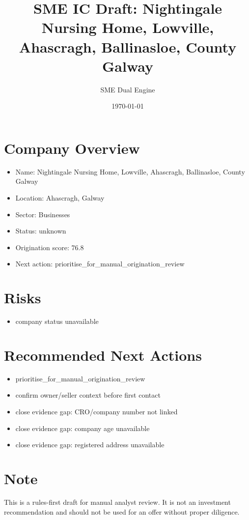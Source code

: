 \documentclass[11pt,a4paper]{article}
\title{SME IC Draft: Nightingale Nursing Home, Lowville, Ahascragh, Ballinasloe, County Galway}
\author{SME Dual Engine}
\date{\today}
\begin{document}
\maketitle
\section*{Company Overview}
\begin{itemize}[leftmargin=1.4em]
\item Name: Nightingale Nursing Home, Lowville, Ahascragh, Ballinasloe, County Galway
\item Location: Ahascragh, Galway
\item Sector: Businesses
\item Status: unknown
\item Origination score: 76.8
\item Next action: prioritise\_for\_manual\_origination\_review
\end{itemize}
\section*{Risks}
\begin{itemize}[leftmargin=1.4em]
\item company status unavailable
\end{itemize}
\section*{Recommended Next Actions}
\begin{itemize}[leftmargin=1.4em]
\item prioritise\_for\_manual\_origination\_review
\item confirm owner/seller context before first contact
\item close evidence gap: CRO/company number not linked
\item close evidence gap: company age unavailable
\item close evidence gap: registered address unavailable
\end{itemize}
\section*{Note}
This is a rules-first draft for manual analyst review. It is not an investment
recommendation and should not be used for an offer without proper diligence.
\end{document}
